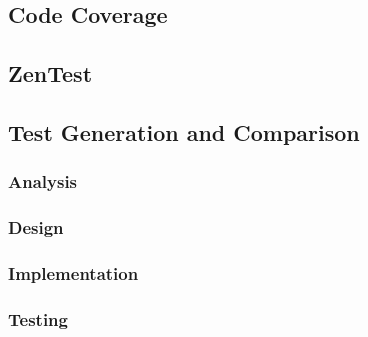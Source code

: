   \subsection{Code Coverage}
  \subsection{ZenTest}
  \subsection{Test Generation and Comparison}
    \subsubsection{Analysis}
    \subsubsection{Design}
    \subsubsection{Implementation}
    \subsubsection{Testing}
